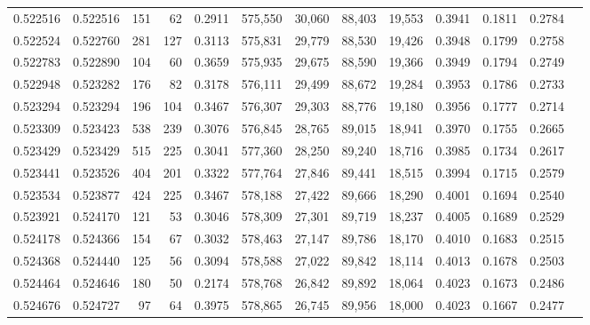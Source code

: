 \begin{tabular}{rrrrrrrrrrrrr}
0.522516 & 0.522516 &   151 &    62 &                                     0.2911 & 575,550 &  30,060 &  88,403 &  19,553 & 0.3941 & 0.1811 & 0.2784 \\
0.522524 & 0.522760 &   281 &   127 &                                     0.3113 & 575,831 &  29,779 &  88,530 &  19,426 & 0.3948 & 0.1799 & 0.2758 \\
0.522783 & 0.522890 &   104 &    60 &                                     0.3659 & 575,935 &  29,675 &  88,590 &  19,366 & 0.3949 & 0.1794 & 0.2749 \\
0.522948 & 0.523282 &   176 &    82 &                                     0.3178 & 576,111 &  29,499 &  88,672 &  19,284 & 0.3953 & 0.1786 & 0.2733 \\
0.523294 & 0.523294 &   196 &   104 &                                     0.3467 & 576,307 &  29,303 &  88,776 &  19,180 & 0.3956 & 0.1777 & 0.2714 \\
0.523309 & 0.523423 &   538 &   239 &                                     0.3076 & 576,845 &  28,765 &  89,015 &  18,941 & 0.3970 & 0.1755 & 0.2665 \\
0.523429 & 0.523429 &   515 &   225 &                                     0.3041 & 577,360 &  28,250 &  89,240 &  18,716 & 0.3985 & 0.1734 & 0.2617 \\
0.523441 & 0.523526 &   404 &   201 &                                     0.3322 & 577,764 &  27,846 &  89,441 &  18,515 & 0.3994 & 0.1715 & 0.2579 \\
0.523534 & 0.523877 &   424 &   225 &                                     0.3467 & 578,188 &  27,422 &  89,666 &  18,290 & 0.4001 & 0.1694 & 0.2540 \\
0.523921 & 0.524170 &   121 &    53 &                                     0.3046 & 578,309 &  27,301 &  89,719 &  18,237 & 0.4005 & 0.1689 & 0.2529 \\
0.524178 & 0.524366 &   154 &    67 &                                     0.3032 & 578,463 &  27,147 &  89,786 &  18,170 & 0.4010 & 0.1683 & 0.2515 \\
0.524368 & 0.524440 &   125 &    56 &                                     0.3094 & 578,588 &  27,022 &  89,842 &  18,114 & 0.4013 & 0.1678 & 0.2503 \\
0.524464 & 0.524646 &   180 &    50 &                                     0.2174 & 578,768 &  26,842 &  89,892 &  18,064 & 0.4023 & 0.1673 & 0.2486 \\
0.524676 & 0.524727 &    97 &    64 &                                     0.3975 & 578,865 &  26,745 &  89,956 &  18,000 & 0.4023 & 0.1667 & 0.2477 \\

\end{tabular}
